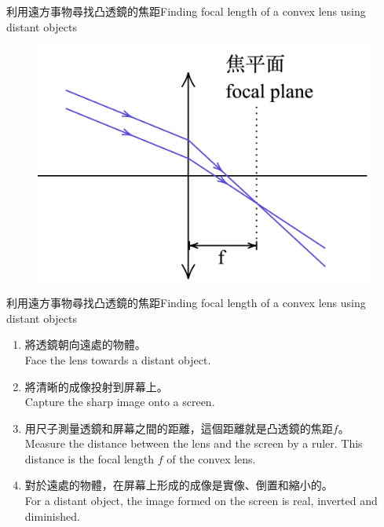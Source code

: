 \documentclass[beamer=true]{standalone}
\begin{document}



\begin{frame}{利用遠方事物尋找凸透鏡的焦距Finding focal length of a convex lens using distant objects}
    \begin{figure}
        \centering
        \includegraphics[width=0.7\linewidth]{../../assets/ddun2du8923.png}


    \end{figure}





\end{frame}

\begin{frame}{利用遠方事物尋找凸透鏡的焦距Finding focal length of a convex lens using distant objects}
    \begin{enumerate}
        \setlength{\itemsep}{.6em}
        \item 將透鏡朝向遠處的物體。\\Face the lens towards a distant object.
        \item 將清晰的成像投射到屏幕上。\\Capture the sharp image onto a screen.
        \item 用尺子測量透鏡和屏幕之間的距離，這個距離就是凸透鏡的焦距$f$。\\Measure the distance between the lens and the screen by a ruler. This distance is the focal length $f$ of the convex lens.
        \item 對於遠處的物體，在屏幕上形成的成像是實像、倒置和縮小的。\\For a distant object, the image formed on the screen is real, inverted and diminished.
    \end{enumerate}
\end{frame}
\end{document}
